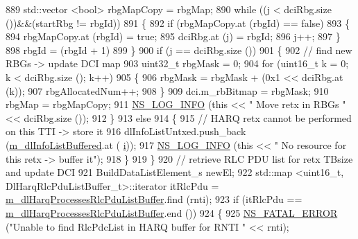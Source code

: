 \begin{DoxyCode}
889               std::vector <bool> rbgMapCopy = rbgMap;
890               \textcolor{keywordflow}{while} ((j < dciRbg.size ())&&(startRbg != rbgId))
891                 \{
892                   \textcolor{keywordflow}{if} (rbgMapCopy.at (rbgId) == \textcolor{keyword}{false})
893                     \{
894                       rbgMapCopy.at (rbgId) = \textcolor{keyword}{true};
895                       dciRbg.at (j) = rbgId;
896                       j++;
897                     \}
898                   rbgId = (rbgId + 1) %
899                 \}
900               \textcolor{keywordflow}{if} (j == dciRbg.size ())
901                 \{
902                   \textcolor{comment}{// find new RBGs -> update DCI map}
903                   uint32\_t rbgMask = 0;
904                   \textcolor{keywordflow}{for} (uint16\_t k = 0; k < dciRbg.size (); k++)
905                     \{
906                       rbgMask = rbgMask + (0x1 << dciRbg.at (k));
907                       rbgAllocatedNum++;
908                     \}
909                   dci.m\_rbBitmap = rbgMask;
910                   rbgMap = rbgMapCopy;
911                   \hyperlink{group__logging_gafbd73ee2cf9f26b319f49086d8e860fb}{NS\_LOG\_INFO} (\textcolor{keyword}{this} << \textcolor{stringliteral}{" Move retx in RBGs "} << dciRbg.size ());
912                 \}
913               \textcolor{keywordflow}{else}
914                 \{
915                   \textcolor{comment}{// HARQ retx cannot be performed on this TTI -> store it}
916                   dlInfoListUntxed.push\_back (\hyperlink{classns3_1_1FdBetFfMacScheduler_ae987d949dcc264154314730346f4a7a8}{m\_dlInfoListBuffered}.at (
      \hyperlink{bernuolliDistribution_8m_a6f6ccfcf58b31cb6412107d9d5281426}{i}));
917                   \hyperlink{group__logging_gafbd73ee2cf9f26b319f49086d8e860fb}{NS\_LOG\_INFO} (\textcolor{keyword}{this} << \textcolor{stringliteral}{" No resource for this retx -> buffer it"});
918                 \}
919             \}
920           \textcolor{comment}{// retrieve RLC PDU list for retx TBsize and update DCI}
921           BuildDataListElement\_s newEl;
922           std::map <uint16\_t, DlHarqRlcPduListBuffer\_t>::iterator itRlcPdu =  
      \hyperlink{classns3_1_1FdBetFfMacScheduler_ace3cb887417444023ca2f39d5de6a7cf}{m\_dlHarqProcessesRlcPduListBuffer}.find (rnti);
923           \textcolor{keywordflow}{if} (itRlcPdu == \hyperlink{classns3_1_1FdBetFfMacScheduler_ace3cb887417444023ca2f39d5de6a7cf}{m\_dlHarqProcessesRlcPduListBuffer}.end ())
924             \{
925               \hyperlink{group__fatal_ga5131d5e3f75d7d4cbfd706ac456fdc85}{NS\_FATAL\_ERROR} (\textcolor{stringliteral}{"Unable to find RlcPdcList in HARQ buffer for RNTI "} << rnti);

\end{DoxyCode}
